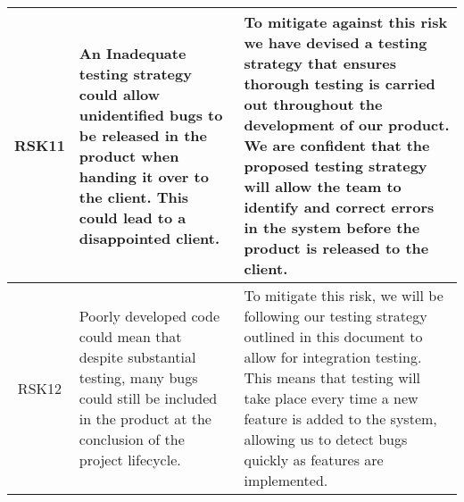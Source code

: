 \begin{xltabular}[H]{\textwidth}{c | X | X}
    \midrule

    RSK11

    &

    An Inadequate testing strategy could allow unidentified bugs to be released in the product when handing it over to the client. This could lead to a disappointed client.

    &

    To mitigate against this risk we have devised a testing strategy that ensures thorough testing is carried out throughout the development of our product. We are confident that the proposed testing strategy will allow the team to identify and correct errors in the system before the product is released to the client.\\

    \midrule

    RSK12

    &

    Poorly developed code could mean that despite substantial testing, many bugs could still be included in the product at the conclusion of the project lifecycle.

    &

    To mitigate this risk, we will be following our testing strategy outlined in this document to allow for integration testing. This means that testing will take place every time a new feature is added to the system, allowing us to detect bugs quickly as features are implemented.\\


\end{xltabular}
\label{tbl:risk_table}
